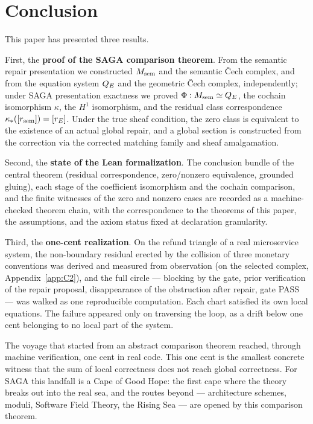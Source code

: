 \section{Conclusion}\label{sec:10}

This paper has presented three results.

First, the \textbf{proof of the SAGA comparison theorem}. From the
semantic repair presentation we constructed $M_{\mathrm{sem}}$ and the semantic
\v{C}ech complex, and from the equation system $Q_{E}$ and the geometric
\v{C}ech complex, independently; under SAGA presentation exactness we
proved $\Phi:M_{\mathrm{sem}}\simeq Q_{E}$, the cochain isomorphism $\kappa$, the
$H^1$ isomorphism, and the residual class correspondence
$\kappa_*([r_{\mathrm{sem}}])=[r_{E}]$. Under the true sheaf condition, the zero
class is equivalent to the existence of an actual global repair, and a
global section is constructed from the correction via the corrected
matching family and sheaf amalgamation.

Second, the \textbf{state of the Lean formalization}. The conclusion
bundle of the central theorem (residual correspondence, zero/nonzero
equivalence, grounded gluing), each stage of the coefficient
isomorphism and the cochain comparison, and the finite witnesses of
the zero and nonzero cases are recorded as a machine-checked theorem
chain, with the correspondence to the theorems of this paper, the
assumptions, and the axiom status fixed at declaration granularity.

Third, the \textbf{one-cent realization}. On the refund triangle of a
real microservice system, the non-boundary residual erected by the
collision of three monetary conventions was derived and measured from
observation (on the selected complex, Appendix~\ref{app:C2}), and the full
circle --- blocking by the gate, prior verification of the repair
proposal, disappearance of the obstruction after repair, gate PASS ---
was walked as one reproducible computation. Each chart satisfied its
own local equations. The failure appeared only on traversing the loop,
as a drift below one cent belonging to no local part of the system.

The voyage that started from an abstract comparison theorem reached,
through machine verification, one cent in real code. This one cent is
the smallest concrete witness that the sum of local correctness does
not reach global correctness. For SAGA this landfall is a Cape of Good
Hope: the first cape where the theory breaks out into the real sea,
and the routes beyond --- architecture schemes, moduli, Software Field
Theory, the Rising Sea --- are opened by this comparison theorem.

